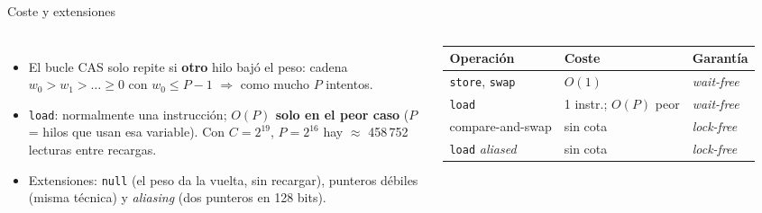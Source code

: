 \begin{frame}{Coste y extensiones}
  \begin{columns}[T]
    \footnotesize
    \begin{itemize}
      \item El bucle CAS solo repite si \textbf{otro} hilo bajó el peso: cadena $w_0 > w_1 > \dots \ge 0$ con $w_0 \le P-1$ $\Rightarrow$ como mucho $P$ intentos.
      \item \texttt{load}: normalmente una instrucción; \textbf{$O(P)$ solo en el peor caso} ($P$ = hilos que usan esa variable). Con $C = 2^{19}$, $P = 2^{16}$ hay $\approx$ 458\,752 lecturas entre recargas.
      \item Extensiones: \texttt{null} (el peso da la vuelta, sin recargar), punteros débiles (misma técnica) y \emph{aliasing} (dos punteros en 128 bits).
    \end{itemize}
    \renewcommand{\arraystretch}{1.15}\footnotesize
    \begin{tabular}{@{}p{2.1cm}p{1.9cm}l@{}}
      \toprule
      Operación & Coste & Garantía\\
      \midrule
      \texttt{store}, \texttt{swap} & $O(1)$ & \emph{wait-free}\\
      \texttt{load} & 1 instr.; $O(P)$ peor & \emph{wait-free}\\
      compare-and-swap & sin cota & \emph{lock-free}\\
      \texttt{load} \emph{aliased} & sin cota & \emph{lock-free}\\
      \bottomrule
    \end{tabular}
    \par{}
  \end{columns}
\end{frame}

